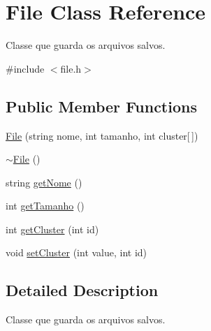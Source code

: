 \hypertarget{classFile}{\section{File Class Reference}
\label{classFile}
}


Classe que guarda os arquivos salvos.  




{\ttfamily \#include $<$file.\+h$>$}

\subsection*{Public Member Functions}
\begin{DoxyCompactItemize}
\item 
\hyperlink{classFile_a19ef2ccc877d781b51d351eb18b961cf}{File} (string nome, int tamanho, int cluster\mbox{[}$\,$\mbox{]})
\item 
\hyperlink{classFile_ac704ebdf5f57d7a1c5ddf409d797fb69}{$\sim$\+File} ()
\item 
string \hyperlink{classFile_aaa36b9ad9a33bdc541165cee474c8f8f}{get\+Nome} ()
\item 
int \hyperlink{classFile_a814c53f4c125523cde4e234b774955a5}{get\+Tamanho} ()
\item 
int \hyperlink{classFile_ab207a5854e4c0cc5dbcb001dbf8b9dcc}{get\+Cluster} (int id)
\item 
void \hyperlink{classFile_ae2dd2a90cdbb5ea1ab653fef2b5732fa}{set\+Cluster} (int value, int id)
\end{DoxyCompactItemize}


\subsection{Detailed Description}
Classe que guarda os arquivos salvos. 

